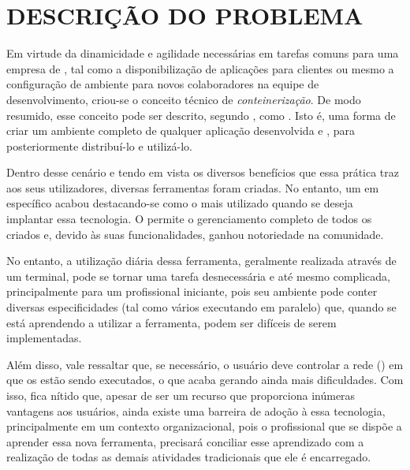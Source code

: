 
\chapter{DESCRIÇÃO DO PROBLEMA}
\label{chap:descricao_do_problema}

Em virtude da dinamicidade e agilidade necessárias em tarefas comuns para uma empresa de \software{}, tal como a disponibilização de aplicações para clientes ou mesmo a configuração de ambiente para novos colaboradores na equipe de desenvolvimento, criou-se o conceito técnico de \textit{conteinerização}. De modo resumido, esse conceito pode ser descrito, segundo \cite{Fernandes18}, como . Isto é, uma forma de criar um ambiente completo de qualquer aplicação desenvolvida e , para posteriormente distribuí-lo e utilizá-lo. 

Dentro desse cenário e tendo em vista os diversos benefícios que essa prática traz aos seus utilizadores, diversas ferramentas foram criadas. No entanto, um \software{} em específico acabou destacando-se como o mais utilizado quando se deseja implantar essa tecnologia. O \textbf{\docker{}} permite o gerenciamento completo de todos os \containers{} criados e, devido às suas funcionalidades, ganhou notoriedade na comunidade. 

No entanto, a utilização diária dessa ferramenta, geralmente realizada através de um terminal, pode se tornar uma tarefa desnecessária e até mesmo complicada, principalmente para um profissional iniciante, pois seu ambiente pode conter diversas especificidades (tal como vários \containers{} executando em paralelo) que, quando se está aprendendo a utilizar a ferramenta, podem ser difíceis de serem implementadas.

Além disso, vale ressaltar que, se necessário, o usuário deve controlar a rede (\dockerNetwork{}) em que os \containers{} estão sendo executados, o que acaba gerando ainda mais dificuldades. Com isso, fica nítido que, apesar de ser um recurso que proporciona inúmeras vantagens aos usuários, ainda existe uma barreira de adoção à essa tecnologia, principalmente em um contexto organizacional, pois o profissional que se dispõe a aprender essa nova ferramenta, precisará conciliar esse aprendizado com a realização de todas as demais atividades tradicionais que ele é encarregado.





